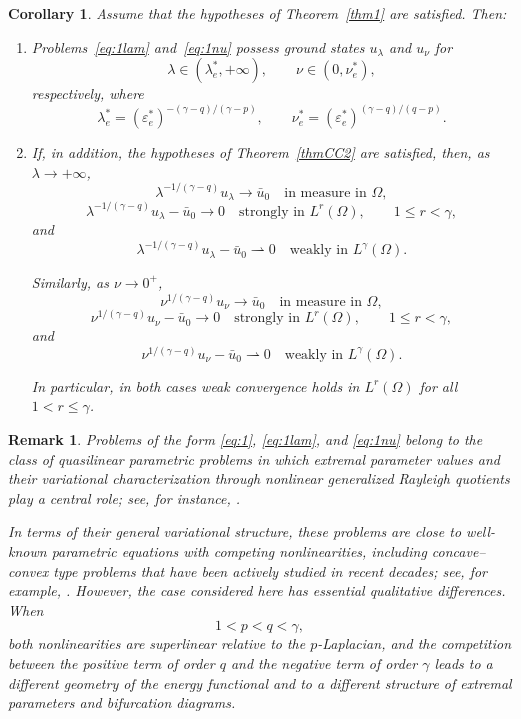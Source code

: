 \documentclass[preprint,11pt]{elsarticle}
\numberwithin{equation}{section}
\newtheorem{corollary}{Corollary}[section]
\newtheorem{remark}{Remark}[section]
\begin{document}
\begin{corollary}\label{cor:scaled-asymptotics}
	Assume that the hypotheses of Theorem~\ref{thm1} are satisfied. Then:
	\begin{enumerate}
		\item[(1)]
		Problems~\eqref{eq:1lam} and~\eqref{eq:1nu} possess ground states
		\(u_\lambda\) and \(u_\nu\) for
		\[
		\lambda\in(\lambda_e^*,+\infty),
		\qquad
		\nu\in(0,\nu_e^*),
		\]
		respectively, where
		\[
		\lambda_e^*
		=
		(\varepsilon_e^*)^{-(\gamma-q)/(\gamma-p)},
		\qquad
		\nu_e^*
		=
		(\varepsilon_e^*)^{(\gamma-q)/(q-p)}.
		\]
		
		\item[(2)]
		If, in addition, the hypotheses of Theorem~\ref{thmCC2} are
		satisfied, then, as \(\lambda\to+\infty\),
		\[
		\lambda^{-1/(\gamma-q)}u_\lambda
		\to
		\bar u_0
		\quad\text{in measure in }\Omega,
		\]
		\[
		\lambda^{-1/(\gamma-q)}u_\lambda-\bar u_0
		\to0
		\quad\text{strongly in }L^r(\Omega),
		\qquad
		1\le r<\gamma,
		\]
		and
		\[
		\lambda^{-1/(\gamma-q)}u_\lambda-\bar u_0
		\rightharpoonup0
		\quad\text{weakly in }L^\gamma(\Omega).
		\]
		
		Similarly, as \(\nu\to0^+\),
		\[
		\nu^{1/(\gamma-q)}u_\nu
		\to
		\bar u_0
		\quad\text{in measure in }\Omega,
		\]
		\[
		\nu^{1/(\gamma-q)}u_\nu-\bar u_0
		\to0
		\quad\text{strongly in }L^r(\Omega),
		\qquad
		1\le r<\gamma,
		\]
		and
		\[
		\nu^{1/(\gamma-q)}u_\nu-\bar u_0
		\rightharpoonup0
		\quad\text{weakly in }L^\gamma(\Omega).
		\]
		
		In particular, in both cases weak convergence holds in
		\(L^r(\Omega)\) for all \(1<r\le\gamma\).
	\end{enumerate}
\end{corollary}

\begin{remark}
	Problems of the form \eqref{eq:1}, \eqref{eq:1lam}, and \eqref{eq:1nu}
	belong to the class of quasilinear parametric problems in which extremal
	parameter values and their variational characterization through nonlinear
	generalized Rayleigh quotients play a central role; see, for instance,
	\cite{ilBob,Il2005,Ilyas2017,IlyasKaye,RamosQuoirinSicilianoSilva}.
	
	In terms of their general variational structure, these problems are close
	to well-known parametric equations with competing nonlinearities, including
	concave--convex type problems that have been actively studied in recent
	decades; see, for example,
	\cite{AmbrosettiBrezisCerami,BartschWillem,Il2005}. However, the case
	considered here has essential qualitative differences. When
	\[
	1<p<q<\gamma,
	\]
	both nonlinearities are superlinear relative to the \(p\)-Laplacian, and
	the competition between the positive term of order \(q\) and the negative
	term of order \(\gamma\) leads to a different geometry of the energy
	functional and to a different structure of extremal parameters and
	bifurcation diagrams.
\end{remark}
\end{document}
